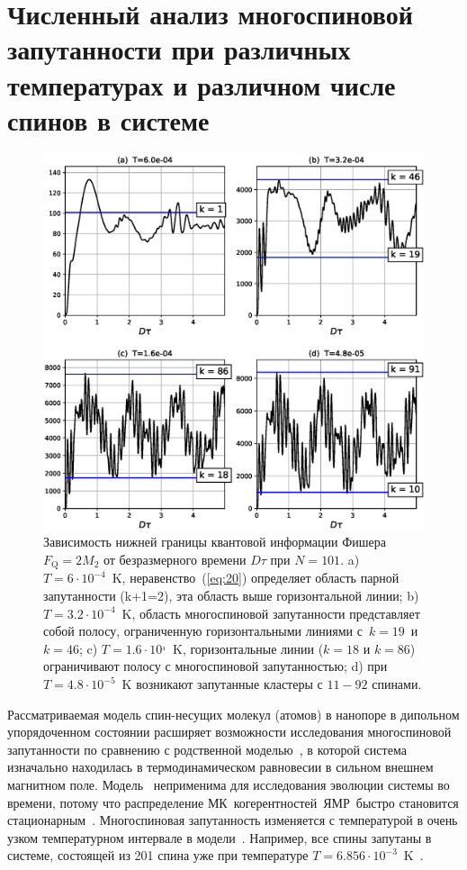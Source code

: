 \documentclass[utf8]{jetp}
\begin{document}
\section{Численный анализ многоспиновой запутанности при различных температурах и различном числе спинов в системе}
\label{sec:5}

\begin{figure}
 	\includegraphics[width=0.95\linewidth]{fisher_low_bound_n101.eps}
	\caption{
	  Зависимость нижней границы  квантовой информации Фишера $F_\mathrm{Q} = 2 M_{2}$
	  от безразмерного времени $D\tau$ при $N=101$.
	  a) $T=6\cdot10^{-4}$~K, неравенство~(\ref{eq:20}) определяет область парной запутанности  (k+1=2), эта область выше горизонтальной линии;
	  b) $T=3.2\cdot10^{-4}$~K, область многоспиновой запутанности представляет собой полосу, ограниченную горизонтальными линиями с~$k=19$~и~$k=46$;
	  c) $T = 1.6\cdot10^{_4}$~K, горизонтальные линии ($k=18$ и $k=86$) ограничивают полосу с многоспиновой запутанностью;
	  d) при $T=4.8\cdot10^{-5}$~K возникают запутанные кластеры с $11-92$ спинами.
	}
	\label{fig:2}
\end{figure}

Рассматриваемая модель спин-несущих молекул (атомов) в нанопоре в дипольном упорядоченном состоянии расширяет возможности исследования многоспиновой запутанности по сравнению с родственной моделью~\cite{Doronin_2019},
в которой система изначально находилась в термодинамическом равновесии в сильном внешнем магнитном поле.
Модель~\cite{Doronin_2019} неприменима для исследования эволюции системы во времени,
потому что распределение МК~когерентностей~ЯМР~быстро становится стационарным~\cite{Doronin_2009}.
Многоспиновая запутанность изменяется с температурой в очень узком температурном интервале в модели~\cite{Doronin_2019}.
Например, все спины запутаны в системе, состоящей из 201 спина уже при температуре $T=6.856\cdot10^{-3}$~K~\cite{Doronin_2019}.
\end{document}
